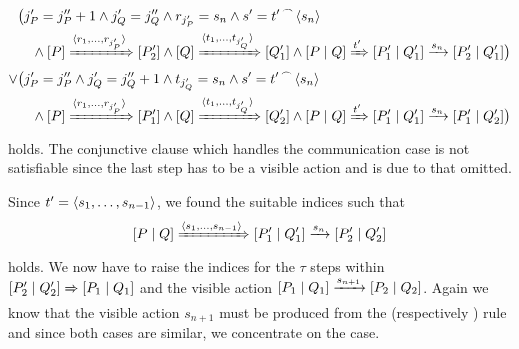 \begin{prf}
\begin{description}
\begin{align*}
	&\bigl(j_P'=j_P''+1\wedge j_Q'=j_Q''\wedge r_{j_P'}=s_n \wedge s'={t'}^{\,\frown{}\,}{\langle s_n\rangle} \\
&\quad\wedge\left[P\right]\xRightarrow{\langle r_1,\ldots,r_{j_P'}\rangle}\left[P_2'\right]\wedge \left[Q\right]\xRightarrow{\langle t_1,\ldots,t_{j_Q'}\rangle}\left[Q_1'\right]\wedge\left[P \mid Q\right]\xRightarrow{t'}\left[P_1' \mid Q_1'\right]\xrightarrow{s_n}\left[P_2' \mid Q_1'\right]\bigr)\\
\vee&  \bigl(j_P'=j_P''\wedge j_Q'=j_Q''+1\wedge t_{j_Q'}=s_n \wedge s'={t'}^{\,\frown{}\,}{\langle s_n\rangle} \\
&\quad \wedge \left[P\right]\xRightarrow{\langle r_1,\ldots,r_{j_P'}\rangle}\left[P_1'\right]\wedge \left[Q\right]\xRightarrow{\langle t_1,\ldots,t_{j_Q'}\rangle}\left[Q_2'\right]\wedge\left[P \mid Q\right]\xRightarrow{t'}\left[P_1' \mid Q_1'\right]\xrightarrow{s_n}\left[P_1' \mid Q_2'\right] \bigr)
\end{align*}
holds. The conjunctive clause which handles the communication case is not satisfiable since the last step has to be a visible action and is due to that omitted.

Since $t'=\langle s_1,\ldots,s_{n-1}\rangle$, we found the suitable indices such that 
\[\left[P \mid Q\right]\xRightarrow{\langle s_1,\ldots,s_{n-1}\rangle}\left[P_1' \mid Q_1'\right]\xrightarrow{s_n}\left[P_2' \mid Q_2'\right]\]
holds. We now have to raise the indices for the $\tau$ steps within $\left[P_2' \mid Q_2'\right]\xRightarrow{}\left[P_1 \mid Q_1\right]$ and the visible action $\left[P_1 \mid Q_1\right]\xrightarrow{s_{n+1}}\left[P_2 \mid Q_2\right]$. Again we know that the visible action $s_{n+1}$ must be produced from the \eparl{} (respectively \eparr{}) rule and since both cases are similar, we concentrate on the \eparl{} case.


\end{description}
\end{prf}
